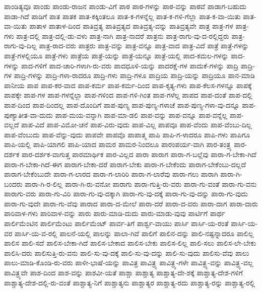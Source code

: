 {ಪಾಂಡಿತ್ಯವೂ
ಪಾಂಡು
ಪಾಂಡು-ರಾಜನ
ಪಾಂಡು-ವಿಗೆ
ಪಾಠ
ಪಾಠ-ಗಳನ್ನು
ಪಾಠ-ವನ್ನು
ಪಾಠವೆ
ಪಾಡಾಗ-ಬಹುದು
ಪಾಡಾ-ಗಿದೆ
ಪಾಡಿಗೆ
ಪಾತ
ಪಾತಕ
ಪಾತ-ಕಕ್ಕಿಂತಲೂ
ಪಾತ-ಕ-ಗಳನ್ನೆಲ್ಲ
ಪಾತ-ಕ-ಗಳಿ-ಗೆಲ್ಲಾ
ಪಾತ-ಕ-ವಾ-ಯಿತು
ಪಾತ-ವಾ-ಯಿತು
ಪಾತಾಳ
ಪಾತಾಳ-ದಿಂದ
ಪಾತಿವ್ರತ್ಯ
ಪಾತಿವ್ರತ್ಯದ
ಪಾತಿವ್ರತ್ಯ-ವನ್ನು
ಪಾತಿವ್ರತ್ಯವೇ
ಪಾತ್ರ
ಪಾತ್ರ-ಗಳ
ಪಾತ್ರ-ಗಳು
ಪಾತ್ರ-ದಲ್ಲಿ
ಪಾತ್ರ-ದಲ್ಲಿ-ಡು-ವಳು
ಪಾತ್ರ-ನಾಗಿ
ಪಾತ್ರ-ನಾದರೆ
ಪಾತ್ರನು
ಪಾತ್ರ-ರಾಗು-ವು-ದ-ರಲ್ಲಿದ್ದರು
ಪಾತ್ರ-ರಾಗು-ವು-ದಿಲ್ಲ
ಪಾತ್ರ-ರಾದ-ವರು
ಪಾತ್ರರು
ಪಾತ್ರ-ವನ್ನು
ಪಾತ್ರ-ವನ್ನೂ
ಪಾತ್ರ-ವಾದ
ಪಾತ್ರ-ವಿದೆ
ಪಾತ್ರೆ
ಪಾತ್ರೆ-ಗಳನ್ನು
ಪಾತ್ರೆ-ಗಳಲ್ಲಿಯೂ
ಪಾತ್ರೆ-ಗಳು
ಪಾತ್ರೆಯ
ಪಾತ್ರೆ-ಯನ್ನು
ಪಾತ್ರೆ-ಯನ್ನೂ
ಪಾತ್ರೆ-ಯಲ್ಲಿ
ಪಾದ-ಕಮಲ-ಗಳನ್ನು
ಪಾದ-ಗಳನ್ನು
ಪಾದ-ಗಳಿಗೆ
ಪಾದ-ಚಾರಿ-ಗಳಾಗಿ-ರು-ವರು
ಪಾದಧೂಳಿ-ಯನ್ನು
ಪಾದರಕ್ಷೆ-ಗಳ
ಪಾದುಕೆ-ಗಳನ್ನು
ಪಾದ್ರಿ
ಪಾದ್ರಿ-ಗಳ
ಪಾದ್ರಿ-ಗಳನ್ನು
ಪಾದ್ರಿ-ಗಳಾ-ರಾದರೂ
ಪಾದ್ರಿ-ಗಳು
ಪಾದ್ರಿ-ಗಳೂ
ಪಾದ್ರಿಯ
ಪಾದ್ರಿ-ಯನ್ನು
ಪಾದ್ರಿಯೂ
ಪಾನ-ಮಾಡಿ
ಪಾನೀಯ
ಪಾಪ
ಪಾಪ-ಕರ-ವಾದ
ಪಾಪ-ಕರ್ಮ
ಪಾಪ-ಕರ್ಮ-ದಿಂದ
ಪಾಪ-ಕೃತ್ಯ-ಗಳು
ಪಾಪ-ಕೆಲಸ-ಗಳನ್ನೂ
ಪಾಪಕ್ಕೆ
ಪಾಪಕ್ಕೇ
ಪಾಪ-ಗಳ
ಪಾಪ-ಗಳನ್ನೆಲ್ಲಾ
ಪಾಪ-ಗಳಿಂದ
ಪಾಪ-ಗಳಿ-ಗಿಂತ
ಪಾಪ-ಗಳೆಲ್ಲ
ಪಾಪದ
ಪಾಪ-ದಂತೆ
ಪಾಪ-ದಲ್ಲಿ
ಪಾಪ-ದಿಂದ
ಪಾಪ-ದಿಂದಲ್ಲ
ಪಾಪ-ದೊಂದಿಗೆ
ಪಾಪ-ಪುಣ್ಯ
ಪಾಪ-ಪುಣ್ಯ-ಗಳಾಚೆ
ಪಾಪ-ಪುಣ್ಯ-ಗಳಾ-ವು-ದನ್ನೂ
ಪಾಪ-ಪುಣ್ಯಾತೀತ-ವಾ-ದುದು
ಪಾಪ-ಮಯ-ವನ್ನಾಗಿ
ಪಾಪ-ಮಾ-ಡಲಿ
ಪಾಪ-ವನ್ನು
ಪಾಪ-ವನ್ನೂ
ಪಾಪ-ವನ್ನೆಲ್ಲ
ಪಾಪ-ವಲ್ಲದೆ
ಪಾಪ-ವಿದೆ
ಪಾಪ-ವಿಮೋ-ಚನೆ
ಪಾಪ-ವಿರು-ವುದು
ಪಾಪ-ವಿಲ್ಲ
ಪಾಪವೂ
ಪಾಪ-ವೆಂದು
ಪಾಪ-ವೆಂಬು-ದಿಲ್ಲ
ಪಾಪ-ವೆಂಬುದು
ಪಾಪ-ವೆನ್ನು-ವುದು
ಪಾಪವೇ
ಪಾಪವೊ
ಪಾಪಾತ್ಮ
ಪಾಪಿ
ಪಾಪಿ-ಗ-ಳಾದರೂ
ಪಾಪಿ-ಗಳು
ಪಾಪಿಗೂ
ಪಾಪಿ-ಯಲ್ಲಿ
ಪಾಪಿ-ಯಾಗಲಿ
ಪಾಪಿ-ಯಾದ
ಪಾಮರ
ಪಾಮರ-ನಿಂದಲೂ
ಪಾರಂಪರ್ಯ-ವಾಗಿ
ಪಾರ-ತಂತ್ರ್ಯ
ಪಾರ-ದರ್ಶಕ
ಪಾರ-ದರ್ಶಕ-ವಾಗುತ್ತ
ಪಾರಮಾರ್ಥಿಕ
ಪಾರ-ವಿಲ್ಲದ
ಪಾರಾ
ಪಾರಾಗ
ಪಾರಾ-ಗ-ಬಲ್ಲೆವು
ಪಾರಾ-ಗ-ಬೇಕಾ-ಗಿದೆ
ಪಾರಾ-ಗ-ಬೇಕಾ-ಗಿದೆ-ಈಗ
ಪಾರಾಗ-ಬೇಕಾ-ದರೆ
ಪಾರಾಗ-ಬೇಕು
ಪಾರಾ-ಗ-ಬೇಕೆಂದು
ಪಾರಾಗ-ಬೇಕೆಂಬು-ದಲ್ಲದೆ
ಪಾರಾಗ-ಬೇಕೆಂಬುದೇ
ಪಾರಾ-ಗ-ಲಾರದ
ಪಾರಾ-ಗ-ಲಾರಿರಿ
ಪಾರಾ-ಗ-ಲಾರೆವು
ಪಾರಾ-ಗಲು
ಪಾರಾಗಿ
ಪಾರಾ-ಗಿ-ಬಂದರು
ಪಾರಾ-ಗಿ-ರ-ಲಿಲ್ಲ
ಪಾರಾ-ಗಿ-ರು-ವನೋ
ಪಾರಾಗು
ಪಾರಾ-ಗುತ್ತಿ-ರು-ವರು
ಪಾರಾ-ಗು-ವಂತೆ
ಪಾರಾ-ಗು-ವನು
ಪಾರಾಗು-ವರು
ಪಾರಾ-ಗು-ವಿರಿ
ಪಾರಾ-ಗು-ವು-ದಕ್ಕಾಗಿ
ಪಾರಾ-ಗು-ವು-ದಕ್ಕೆ
ಪಾರಾ-ಗು-ವು-ದನ್ನು
ಪಾರಾ-ಗು-ವುದು
ಪಾರಾ-ಗು-ವುದೇ
ಪಾರಾ-ಗು-ವೆವು
ಪಾರಾದ
ಪಾರಾ-ದ-ಮೇಲೆ
ಪಾರಾ-ದರೆ
ಪಾರಾ-ದ-ವರು
ಪಾರಾ-ದಾಗ
ಪಾರಾ-ದಾರು
ಪಾರಿವಾಳ-ಗಳು
ಪಾರಿವಾಳ-ವನ್ನು
ಪಾರು
ಪಾರು-ಮಾಡಿ-ದುದು
ಪಾರು-ಮಾಡು-ವುವು
ಪಾರ್ಟಿಗೆ
ಪಾರ್ಥ
ಪಾರ್ಲಿಮೆಂಟಿನ
ಪಾರ್ಲಿಮೆಂಟು
ಪಾರ್ಲಿಮೆಂಟ್
ಪಾರ್ವ-ತಿಗೆ
ಪಾರ್ಶ್ವ-ವಾಯು
ಪಾರ್ಸಿ
ಪಾರ್ಸಿ-ಯ-ರಂತೆ
ಪಾರ್ಸಿ-ಯ-ವರ
ಪಾರ್ಸಿ-ಯ-ವ-ರಲ್ಲಿ
ಪಾಲನೆ-ಯಲ್ಲಿ
ಪಾಲನ್ನು
ಪಾಲಾ-ಗಿವೆ
ಪಾಲಿಗೆ
ಪಾಲಿನ-ದನ್ನು
ಪಾಲಿ-ನಷ್ಟನ್ನಾದರೂ
ಪಾಲಿಲ್ಲ
ಪಾಲಿಸ
ಪಾಲಿ-ಸದೆ
ಪಾಲಿಸ-ಬೇಕಾ-ಗಿದೆ
ಪಾಲಿಸ-ಬೇಕಾದ
ಪಾಲಿಸ-ಬೇಕು
ಪಾಲಿಸ-ಲಿಲ್ಲ
ಪಾಲಿ-ಸಲು
ಪಾಲಿಸ-ಲೇ-ಬೇಕು
ಪಾಲಿಸಿ-ದರು
ಪಾಲಿಸುತ್ತಿ-ರು-ವನು
ಪಾಲಿ-ಸು-ವು-ದಕ್ಕೆ
ಪಾಲಿ-ಸು-ವು-ದನ್ನು
ಪಾಲಿ-ಸು-ವುದು
ಪಾಲಿಸು-ವೆವು
ಪಾಲು
ಪಾಲು-ಮಾಡಿ-ಕೊಂಡಿ-ರು-ವರು
ಪಾಳೀ-ಭಾಷೆ-ಯನ್ನು
ಪಾವಿತ್ರ
ಪಾವಿತ್ರ್ಯ
ಪಾವಿತ್ರ್ಯ-ಗಳೇ
ಪಾವಿತ್ರ್ಯ-ವನ್ನು
ಪಾವಿತ್ರ್ಯ-ವಲ್ಲ
ಪಾವಿತ್ರ್ಯವೇ
ಪಾಶ-ದಿಂದ
ಪಾಶ-ವನ್ನು
ಪಾಶವೀ-ಯತೆ
ಪಾಶ್ಚಾ
ಪಾಶ್ಚಾತ್ಯ
ಪಾಶ್ಚಾತ್ಯ-ದೇ-ಶಕ್ಕೆ
ಪಾಶ್ಚಾತ್ಯ-ದೇಶ-ಗಳಿಗೆ
ಪಾಶ್ಚಾತ್ಯ-ದೇಶ-ದಲ್ಲಿ-ರು-ವಂತೆ
ಪಾಶ್ಚಾತ್ಯ-ನಿಗೆ
ಪಾಶ್ಚಾತ್ಯನು
ಪಾಶ್ಚಾತ್ಯರ
ಪಾಶ್ಚಾತ್ಯ-ರದು
ಪಾಶ್ಚಾತ್ಯ-ರನ್ನು
ಪಾಶ್ಚಾತ್ಯ-ರಲ್ಲಿ
}
